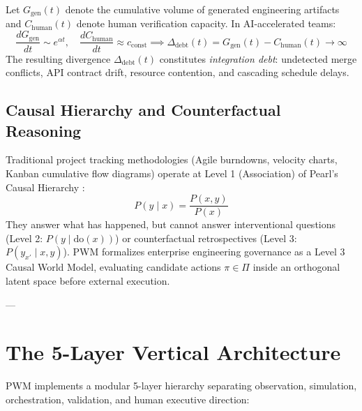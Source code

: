 \documentclass[11pt,a4paper]{article}
\begin{document}
Let $G_{\text{gen}}(t)$ denote the cumulative volume of generated engineering artifacts and $C_{\text{human}}(t)$ denote human verification capacity. In AI-accelerated teams:
\begin{equation}
    \frac{d G_{\text{gen}}}{dt} \sim e^{\alpha t}, \quad \frac{d C_{\text{human}}}{dt} \approx c_{\text{const}} \implies \Delta_{\text{debt}}(t) = G_{\text{gen}}(t) - C_{\text{human}}(t) \to \infty
\end{equation}
The resulting divergence $\Delta_{\text{debt}}(t)$ constitutes \emph{integration debt}: undetected merge conflicts, API contract drift, resource contention, and cascading schedule delays.

\subsection{Causal Hierarchy and Counterfactual Reasoning}
Traditional project tracking methodologies (Agile burndowns, velocity charts, Kanban cumulative flow diagrams) operate at Level 1 (Association) of Pearl's Causal Hierarchy \cite{pearl2009}:
\begin{equation}
    P(y \mid x) = \frac{P(x, y)}{P(x)}
\end{equation}
They answer what has happened, but cannot answer interventional questions (Level 2: $P(y \mid \text{do}(x))$) or counterfactual retrospectives (Level 3: $P(y_{x'} \mid x, y)$). PWM formalizes enterprise engineering governance as a Level 3 Causal World Model, evaluating candidate actions $\pi \in \Pi$ inside an orthogonal latent space before external execution.

---

\section{The 5-Layer Vertical Architecture}

PWM implements a modular 5-layer hierarchy separating observation, simulation, orchestration, validation, and human executive direction:
\end{document}
